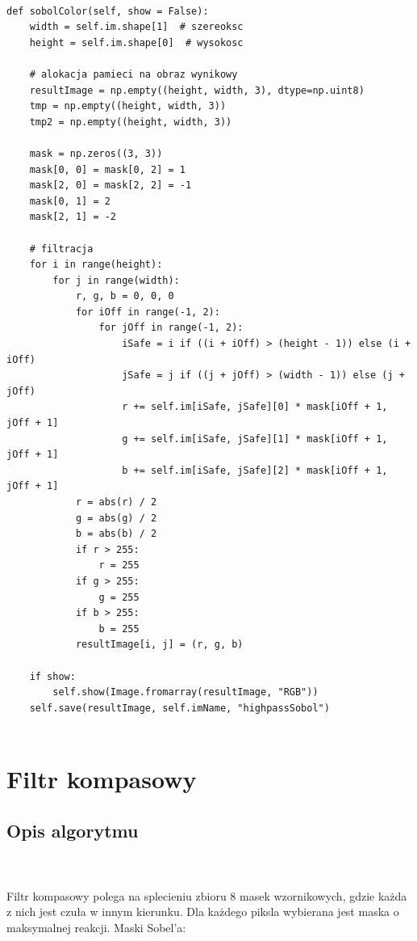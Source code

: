 \documentclass[final,a4paper,openany,12pt]{mwbk}
\begin{document}
\newpage


\begin{lstlisting}[caption=Operator Sobel'a (obraz barwny)]
	
def sobolColor(self, show = False):
	width = self.im.shape[1]  # szereoksc
	height = self.im.shape[0]  # wysokosc
	
	# alokacja pamieci na obraz wynikowy
	resultImage = np.empty((height, width, 3), dtype=np.uint8)
	tmp = np.empty((height, width, 3))
	tmp2 = np.empty((height, width, 3))
	
	mask = np.zeros((3, 3))
	mask[0, 0] = mask[0, 2] = 1
	mask[2, 0] = mask[2, 2] = -1
	mask[0, 1] = 2
	mask[2, 1] = -2
	
	# filtracja
	for i in range(height):
		for j in range(width):
			r, g, b = 0, 0, 0
			for iOff in range(-1, 2):
				for jOff in range(-1, 2):
					iSafe = i if ((i + iOff) > (height - 1)) else (i + iOff)
					jSafe = j if ((j + jOff) > (width - 1)) else (j + jOff)
					r += self.im[iSafe, jSafe][0] * mask[iOff + 1, jOff + 1]
					g += self.im[iSafe, jSafe][1] * mask[iOff + 1, jOff + 1]
					b += self.im[iSafe, jSafe][2] * mask[iOff + 1, jOff + 1]
			r = abs(r) / 2
			g = abs(g) / 2
			b = abs(b) / 2
			if r > 255:
				r = 255
			if g > 255:
				g = 255
			if b > 255:
				b = 255
			resultImage[i, j] = (r, g, b)
	
	if show:
		self.show(Image.fromarray(resultImage, "RGB"))
	self.save(resultImage, self.imName, "highpassSobol")
	
\end{lstlisting}

\newpage

\section{Filtr kompasowy}
\subsection*{Opis algorytmu}
\hfill
\\\\
\indent Filtr kompasowy polega na splecieniu zbioru 8 masek wzornikowych, gdzie każda z nich jest czuła w innym kierunku. Dla każdego piksla wybierana jest maska o maksymalnej reakcji. Maski Sobel'a:
\end{document}
